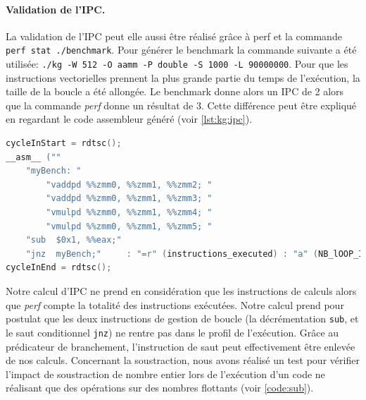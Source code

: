         \begin{table}[h!]
        \centering
        \caption{Vérification du nombre d'instructions exécutées avec l'outil perf.}
        \label{tab:kg_vs_perf}
        \end{table}
        
        
        
        \paragraph{Validation de l'IPC.} La validation de l'IPC peut elle aussi être réalisé grâce à perf et la commande \verb|perf stat ./benchmark|. Pour générer le benchmark la commande suivante a été utilisée: \verb|./kg -W 512 -O aamm -P double -S 1000 -L 90000000|. Pour que les instructions vectorielles prennent la plus grande partie du temps de l'exécution, la taille de la boucle a été allongée. Le benchmark donne alors un IPC de 2 alors que la commande \textit{perf} donne un résultat de 3. Cette différence peut être expliqué en regardant le code assembleur généré (voir \autoref{lst:kg:ipc}). 
        
        \begin{lstlisting}[label=lst:kg:ipc ,language=C, caption=Code généré par la commande ./kg -W 512 -O aamm -P double]
cycleInStart = rdtsc();
__asm__ ("" 
    "myBench: " 
		"vaddpd %%zmm0, %%zmm1, %%zmm2; "
		"vaddpd %%zmm0, %%zmm1, %%zmm3; "
		"vmulpd %%zmm0, %%zmm1, %%zmm4; "
		"vmulpd %%zmm0, %%zmm1, %%zmm5; "
    "sub  $0x1, %%eax;"
    "jnz  myBench;"		: "=r" (instructions_executed) : "a" (NB_lOOP_IN));
cycleInEnd = rdtsc();
\end{lstlisting}
        
        Notre calcul d'IPC ne prend en considération que les instructions de calculs alors que \textit{perf} compte la totalité des instructions exécutées. Notre calcul prend pour postulat que les deux instructions de gestion de boucle (la décrémentation \verb|sub|, et le saut conditionnel \verb|jnz|) ne rentre pas dans le profil de l'exécution. Grâce au prédicateur de branchement, l'instruction de saut peut effectivement être enlevée de nos calculs. Concernant la soustraction, nous avons réalisé un test pour vérifier l'impact de soustraction de nombre entier lors de l'exécution d'un code ne réalisant que des opérations sur des nombres flottants (voir \autoref{code:sub}). 
        
